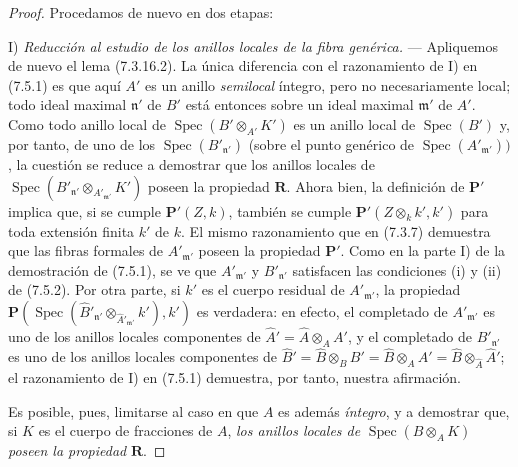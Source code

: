 \begin{proof}
Procedamos de nuevo en dos etapas:

I) \emph{Reducción al estudio de los anillos locales de la fibra genérica.}
--- Apliquemos de nuevo el lema (7.3.16.2). La única diferencia con el
razonamiento de I) en (7.5.1) es que aquí $A'$ es un anillo \emph{semilocal}
íntegro, pero no necesariamente local; todo ideal maximal
$\mathfrak n'$ de $B'$ está entonces sobre un ideal maximal
$\mathfrak m'$ de $A'$. Como todo anillo local de
$\operatorname{Spec}(B'\otimes_{A'}K')$ es un anillo local de
$\operatorname{Spec}(B')$ y, por tanto, de uno de los
$\operatorname{Spec}(B'_{\mathfrak n'})$ (sobre el punto genérico de
$\operatorname{Spec}(A'_{\mathfrak m'}))$, la cuestión se reduce a
demostrar que los anillos locales de
$\operatorname{Spec}(B'_{\mathfrak n'}
\otimes_{A'_{\mathfrak m'}}K')$
poseen la propiedad $\boldsymbol R$. Ahora bien, la definición de
$\boldsymbol P'$ implica que, si se cumple $\boldsymbol P'(Z,k)$,
también se cumple $\boldsymbol P'(Z\otimes_k k',k')$ para toda extensión
finita $k'$ de $k$. El mismo razonamiento que en (7.3.7) demuestra que
las fibras formales de $A'_{\mathfrak m'}$ poseen la propiedad
$\boldsymbol P'$. Como en la parte I) de la demostración de (7.5.1),
se ve que $A'_{\mathfrak m'}$ y $B'_{\mathfrak n'}$ satisfacen las
condiciones (i) y (ii) de (7.5.2). Por otra parte, si $k'$ es el cuerpo
residual de $A'_{\mathfrak m'}$, la propiedad
$\boldsymbol P(\operatorname{Spec}(\widehat{B}'_{\mathfrak n'}
\otimes_{\widehat{A}'_{\mathfrak m'}}k'),k')$
es verdadera: en efecto, el completado de $A'_{\mathfrak m'}$ es uno de los anillos
locales componentes de $\widehat{A}'=\widehat A\otimes_A A'$, y el
completado de $B'_{\mathfrak n'}$ es uno de los anillos locales
componentes de
$\widehat{B}'=\widehat B\otimes_B B'
=\widehat B\otimes_A A'
=\widehat B\otimes_{\widehat A}\widehat{A}'$;
el razonamiento de I) en (7.5.1) demuestra, por tanto, nuestra afirmación.

Es posible, pues, limitarse al caso en que $A$ es además \emph{íntegro}, y a
demostrar que, si $K$ es el cuerpo de fracciones de $A$, \emph{los anillos
locales de} $\operatorname{Spec}(B\otimes_A K)$ \emph{poseen la propiedad}
$\boldsymbol R$.


\end{proof}

